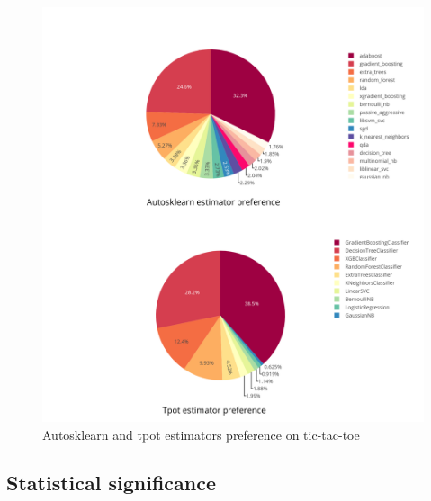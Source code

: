 \begin{figure}[!h]
    	\centering
    	\includegraphics[width=0.8\linewidth]{thesis_template/images/pieplotBoth.png}
    	\caption{Autosklearn and tpot estimators preference on tic-tac-toe}
    	\label{fig:algorithm}
        \end{figure}



\subsection{Statistical significance}

